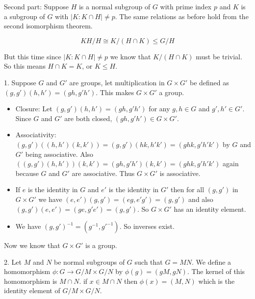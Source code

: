 \documentclass[12pt]{report}
\begin{document}
Second part: Suppose $H$ is a normal subgroup of $G$ with prime index $p$ and
$K$ is a subgroup of $G$ with $|K: K\cap H| \neq p$. The same relations as
before hold from the second isomorphism theorem.

$$KH/H \cong K/(H \cap K) \leq G/H $$

But this time since $|K : K\cap H| \neq p$ we know that $K/(H \cap K)$ must be
trivial. So this means $H \cap K = K$, or $K \leq H$.


1. Suppose $G$ and $G'$ are groups, let multiplication in $G \times G'$ be
defined as $(g,g')(h,h') = (gh,g'h')$. This makes $G \times G'$ a group.

\begin{itemize}
  \item Closure: Let $(g,g')(h,h') = (gh,g'h')$ for any $g,h \in G$ and $g',h'
        \in G'$. Since $G$ and $G'$ are both closed, $(gh,g'h') \in G\times G'$.

  \item Associativity: $(g,g')((h,h')(k,k')) = (g,g')(hk,h'k') = (ghk,g'h'k')$
        by $G$ and $G'$ being associative. Also $((g,g')(h,h'))(k,k') =
        (gh,g'h')(k,k') = (ghk,g'h'k')$ again because $G$ and $G'$ are
        associative. Thus $G \times G'$ is associative.

  \item If $e$ is the identity in $G$ and $e'$ is the identity in $G'$ then
        for all $(g,g')$ in $G \times G'$ we have $(e,e')(g,g') = (eg,e'g') =
        (g,g')$ and also $(g,g')(e,e') = (ge,g'e') =
        (g,g')$. So $G \times G'$ has an identity element.

  \item We have $(g,g')^{-1} = (g^{-1},g'^{-1})$. So inverses exist.
  \end{itemize}

Now we know that $G \times G'$ is a group.

2. Let $M$ and $N$ be normal subgroups of $G$ such that $G = MN$. We define a
homomorphism $\phi: G \to G/M \times G/N$ by $\phi(g) = (gM, gN)$. The kernel of
this homomorphism is $M \cap N$. if $x \in M \cap N$ then $\phi(x) = (M,N)$
which is the identity element of $G/M \times G/N$.

\end{document}
